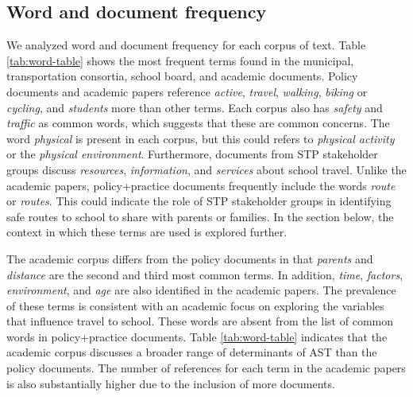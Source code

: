 \documentclass[preprint, 3p,
authoryear]{elsarticle} %
\begin{document}
\hypertarget{word-and-document-frequency}{%
\subsection{Word and document
frequency}\label{word-and-document-frequency}}

We analyzed word and document frequency for each corpus of text. Table
\ref{tab:word-table} shows the most frequent terms found in the
municipal, transportation consortia, school board, and academic
documents. Policy documents and academic papers reference \emph{active},
\emph{travel}, \emph{walking}, \emph{biking} or \emph{cycling}, and
\emph{students} more than other terms. Each corpus also has
\emph{safety} and \emph{traffic} as common words, which suggests that
these are common concerns. The word \emph{physical} is present in each
corpus, but this could refers to \emph{physical activity} or the
\emph{physical environment}. Furthermore, documents from STP stakeholder
groups discuss \emph{resources}, \emph{information}, and \emph{services}
about school travel. Unlike the academic papers, policy+practice
documents frequently include the words \emph{route} or \emph{routes}.
This could indicate the role of STP stakeholder groups in identifying
safe routes to school to share with parents or families. In the section
below, the context in which these terms are used is explored further.

The academic corpus differs from the policy documents in that
\emph{parents} and \emph{distance} are the second and third most common
terms. In addition, \emph{time}, \emph{factors}, \emph{environment}, and
\emph{age} are also identified in the academic papers. The prevalence of
these terms is consistent with an academic focus on exploring the
variables that influence travel to school. These words are absent from
the list of common words in policy+practice documents. Table
\ref{tab:word-table} indicates that the academic corpus discusses a
broader range of determinants of AST than the policy documents. The
number of references for each term in the academic papers is also
substantially higher due to the inclusion of more documents.
\end{document}
